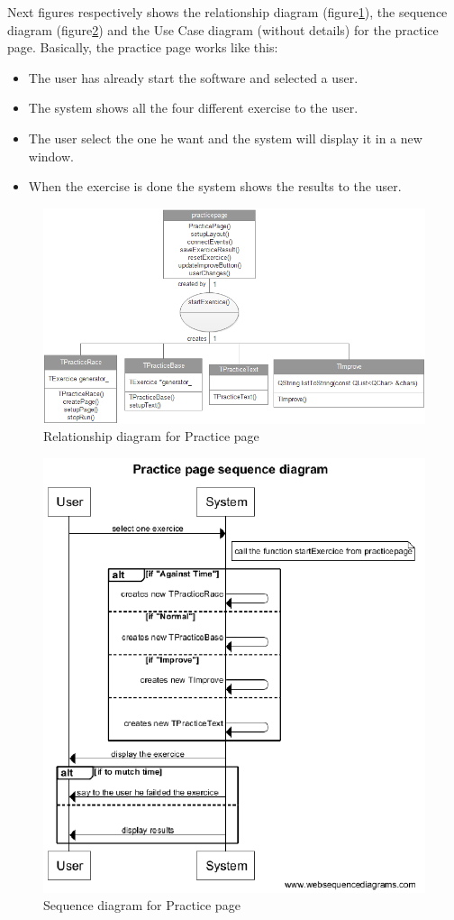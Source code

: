 Next figures respectively shows the relationship diagram (figure\ref{Rpracticepage}), the sequence diagram (figure\ref{Spracticepage}) and the Use Case diagram (without details) for the practice page. Basically, the practice page works like this:
\begin{itemize}
\item The user has already start the software and selected a user.
\item The system shows all the four different exercise to the user.
\item The user select the one he want and the system will display it in a new window.
\item When the exercise is done the system shows the results to the user.
\end{itemize}

\begin{figure}[H]
	\centering
    \includegraphics[width=12cm]{diagrams/Rpracticepage.png}
    \caption{Relationship diagram for Practice page}  
    \label{Rpracticepage} 
\end{figure}
\begin{figure}[H]
	\centering
    \includegraphics[width=12cm]{diagrams/Spracticepage.png}
    \caption{Sequence diagram for Practice page}
    \label{Spracticepage}
\end{figure}
